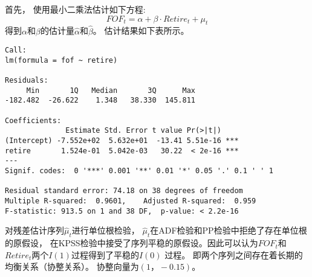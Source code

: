 首先， 使用最小二乘法估计如下方程:
$$FOF_t = \alpha + \beta \cdot Retire_t + \mu_t$$
得到$\alpha$和$\beta$的估计量$\hat{\alpha}$和$\hat{\beta}$。 估计结果如下表所示。

\begin{framed}
\begin{verbatim} 
Call:
lm(formula = fof ~ retire)

Residuals:
     Min       1Q   Median       3Q      Max 
-182.482  -26.622    1.348   38.330  145.811 

Coefficients:
              Estimate Std. Error t value Pr(>|t|)    
(Intercept) -7.552e+02  5.632e+01  -13.41 5.51e-16 ***
retire       1.524e-01  5.042e-03   30.22  < 2e-16 ***
---
Signif. codes:  0 '***' 0.001 '**' 0.01 '*' 0.05 '.' 0.1 ' ' 1

Residual standard error: 74.18 on 38 degrees of freedom
Multiple R-squared:  0.9601,    Adjusted R-squared:  0.959 
F-statistic: 913.5 on 1 and 38 DF,  p-value: < 2.2e-16
\end{verbatim}
\end{framed}



对残差估计序列${\hat{\mu}_t}$进行单位根检验， ${\hat{\mu}_t}$在ADF检验和PP检验中拒绝了存在单位根的原假设， 在KPSS检验中接受了序列平稳的原假设。因此可以认为${FOF_t}$和${Retire_t}$两个$I(1)$过程得到了平稳的$I(0)$
过程。 即两个序列之间存在着长期的均衡关系（协整关系）。 协整向量为$(1， -0.15)$。


